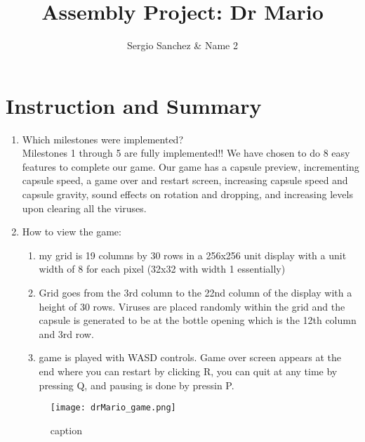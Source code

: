 \documentclass{article}
\title{Assembly Project: Dr Mario}
\author{Sergio Sanchez & Name 2}
\begin{document}
\maketitle

\section{Instruction and Summary}

\begin{enumerate}

    \item Which milestones were implemented?\\ 
    Milestones 1 through 5 are fully implemented!! We have chosen to do 8 easy features to complete our game. Our game has a capsule preview, incrementing capsule speed, a game over and restart screen, increasing capsule speed and capsule gravity, sound effects on rotation and dropping, and increasing levels upon clearing all the viruses.

    \item How to view the game:
    
    \begin{enumerate}

    \item
    my grid is 19 columns by 30 rows in a 256x256 unit display with a unit width of 8 for each pixel (32x32 with width 1 essentially)
    \item
    Grid goes from the 3rd column to the 22nd column of the display with a height of 30 rows. Viruses are placed randomly within the grid and the capsule is generated to be at the bottle opening which is the 12th column and 3rd row.
    \item
    game is played with WASD controls. Game over screen appears at the end where you can restart by clicking R, you can quit at any time by pressing Q, and pausing is done by pressin P.

    \end{enumerate}

    

\begin{figure}[ht!]
    \centering
    \texttt{[image: drMario\_game.png]}
    \caption{caption}
    \label{Instructions}
\end{figure}


\end{enumerate}
\end{document}
